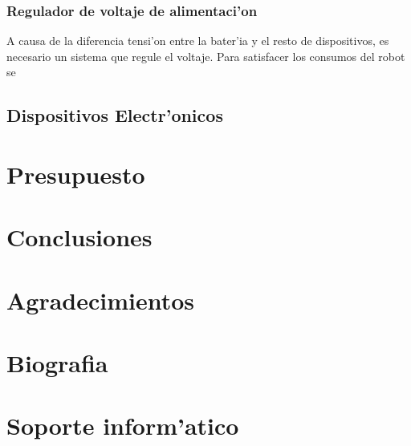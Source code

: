\documentclass[twoside,12pt]{article}
\begin{document}
\subsubsection{Regulador de voltaje de alimentaci'on}
A causa de la diferencia tensi'on entre la bater'ia y el resto de dispositivos, es necesario un sistema que regule el voltaje. Para satisfacer los consumos del robot se 


\newpage
\subsection{Dispositivos Electr'onicos}


\newpage

\section{Presupuesto}
\newpage

\section{Conclusiones}
\newpage

\section{Agradecimientos}
\newpage

\section{Biografia}
\newpage

\section{Soporte inform'atico}
\end{document}
